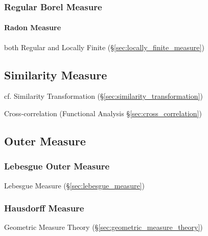 \subsubsection{Regular Borel Measure}\label{sec:regualr_borel}\hfill

\paragraph{Radon Measure}\label{sec:radon_measure}\hfill

both Regular and Locally Finite (\S\ref{sec:locally_finite_measure})



\subsection{Similarity Measure}\label{sec:similarity_measure}

\fist cf. Similarity Transformation (\S\ref{sec:similarity_transformation})

Cross-correlation (Functional Analysis \S\ref{sec:cross_correlation})



\subsection{Outer Measure}\label{sec:outer_measure}

\subsubsection{Lebesgue Outer Measure}\label{sec:lebesgue_outer_measure}

Lebesgue Measure (\S\ref{sec:lebesgue_measure})



\subsubsection{Hausdorff Measure}\label{sec:hausdorff_measure}

\fist Geometric Measure Theory (\S\ref{sec:geometric_measure_theory})



